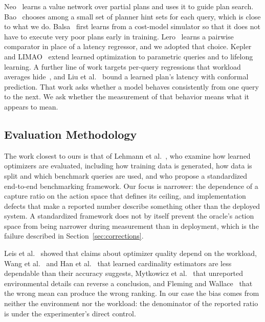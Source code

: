 \documentclass[conference]{IEEEtran}
\begin{document}
Neo~\cite{neo} learns a value network over partial plans and uses it to guide
plan search. Bao~\cite{bao} chooses among a small set of planner hint sets for
each query, which is close to what we do. Balsa~\cite{balsa} first learns from
a cost-model simulator so that it does not have to execute very poor plans
early in training. Lero~\cite{lero,lerojournal} learns a pairwise comparator in
place of a latency regressor, and we adopted that choice. Kepler~\cite{kepler}
and LIMAO~\cite{limao} extend learned optimization to parametric queries and to
lifelong learning. A further line of work targets per-query regressions that
workload averages hide~\cite{reload,leonplus,parqo,robustsurvey}, and Liu et
al.~\cite{conformallqo} bound a learned plan's latency with conformal
prediction. That work asks whether a model behaves consistently from one query
to the next. We ask whether the measurement of that behavior means what it
appears to mean.

\subsection{Evaluation Methodology}

The work closest to ours is that of Lehmann et al.~\cite{lehmann}, who examine
how learned optimizers are evaluated, including how training data is
generated, how data is split and which benchmark queries are used, and who
propose a standardized end-to-end benchmarking framework. Our focus is
narrower: the dependence of a capture ratio on the action space that defines
its ceiling, and implementation defects that make a reported number describe
something other than the deployed system. A standardized framework does not by
itself prevent the oracle's action space from being narrower during
measurement than in deployment, which is the failure described in
Section~\ref{sec:corrections}.

Leis et al.~\cite{leis,lookingglass,stillasking} showed that claims about
optimizer quality depend on the workload, Wang et al.~\cite{ready} and Han et
al.~\cite{cardbench} that learned cardinality estimators are less dependable
than their accuracy suggests, Mytkowicz et al.~\cite{wrongdata} that unreported
environmental details can reverse a conclusion, and Fleming and
Wallace~\cite{fleming} that the wrong mean can produce the wrong ranking. In
our case the bias comes from neither the environment nor the workload: the
denominator of the reported ratio is under the experimenter's direct control.
\end{document}
